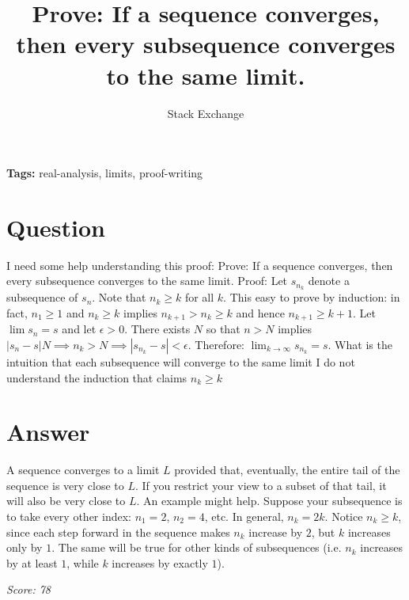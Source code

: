 \documentclass{article}
\title{Prove: If a sequence converges, then every subsequence converges to the same limit.}
\author{Stack Exchange}
\date{}
\begin{document}
\maketitle

\noindent\textbf{Tags:} real-analysis, limits, proof-writing

\section*{Question}
I need some help understanding this proof: Prove: If a sequence converges, then every subsequence converges to the same limit. Proof: Let $s_{n_k}$ denote a subsequence of $s_n$. Note that $n_k \geq k$ for all $k$. This easy to prove by induction: in fact, $n_1 \geq 1$ and $n_k \geq k$ implies $n_{k+1} > n_k \geq k$ and hence $n_{k+1} \geq k+1$. Let $\lim s_n = s$ and let $\epsilon > 0$. There exists $N$ so that $n>N$ implies $|s_n - s|  N \implies n_k > N \implies |s_{n_k} - s| < \epsilon$. Therefore: $\lim_{k \to \infty} s_{n_k} = s$. What is the intuition that each subsequence will converge to the same limit I do not understand the induction that claims $n_k \geq k$

\section*{Answer}
A sequence converges to a limit $L$ provided that, eventually, the entire tail of the sequence is very close to $L$. If you restrict your view to a subset of that tail, it will also be very close to $L$. An example might help. Suppose your subsequence is to take every other index: $n_1 = 2$, $n_2 = 4$, etc. In general, $n_k = 2k$. Notice $n_k \geq k$, since each step forward in the sequence makes $n_k$ increase by $2$, but $k$ increases only by $1$. The same will be true for other kinds of subsequences (i.e. $n_k$ increases by at least $1$, while $k$ increases by exactly $1$).

\vspace{1em}
\noindent\textit{Score: 78}
\end{document}
